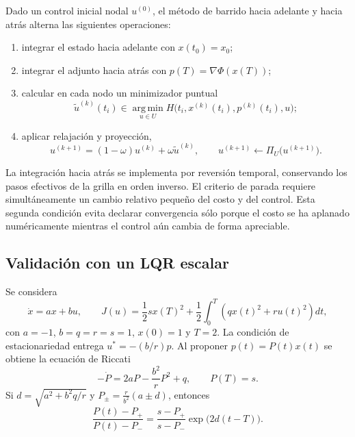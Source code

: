 \documentclass[11pt,a4paper]{article}
\begin{document}
Dado un control inicial nodal $u^{(0)}$, el método de barrido hacia adelante y hacia atrás alterna las siguientes operaciones:
\begin{enumerate}
    \item integrar el estado hacia adelante con $x(t_0)=x_0$;
    \item integrar el adjunto hacia atrás con $p(T)=\nabla\Phi(x(T))$;
    \item calcular en cada nodo un minimizador puntual
    \begin{equation}
        \widetilde u^{(k)}(t_i)
        \in \operatorname*{arg\,min}_{u\in U}
        H\bigl(t_i,x^{(k)}(t_i),p^{(k)}(t_i),u\bigr);
    \end{equation}
    \item aplicar relajación y proyección,
    \begin{equation}
        u^{(k+1)}=(1-\omega)u^{(k)}+\omega\widetilde u^{(k)},
        \qquad u^{(k+1)}\leftarrow\Pi_U\bigl(u^{(k+1)}\bigr).
    \end{equation}
\end{enumerate}

La integración hacia atrás se implementa por reversión temporal, conservando los pasos efectivos de la grilla en orden inverso. El criterio de parada requiere simultáneamente un cambio relativo pequeño del costo y del control. Esta segunda condición evita declarar convergencia sólo porque el costo se ha aplanado numéricamente mientras el control aún cambia de forma apreciable.

\subsection{Validación con un LQR escalar}

Se considera
\begin{equation}
    \dot x=ax+bu,
    \qquad
    J(u)=\frac{1}{2}s x(T)^2
    +\frac{1}{2}\int_0^T\left(qx(t)^2+ru(t)^2\right)dt,
\end{equation}
con $a=-1$, $b=q=r=s=1$, $x(0)=1$ y $T=2$. La condición de estacionariedad entrega $u^*=-(b/r)p$. Al proponer $p(t)=P(t)x(t)$ se obtiene la ecuación de Riccati
\begin{equation}
    -\dot P=2aP-\frac{b^2}{r}P^2+q,
    \qquad P(T)=s.
\end{equation}
Si $d=\sqrt{a^2+b^2q/r}$ y $P_{\pm}=\frac{r}{b^2}(a\pm d)$, entonces
\begin{equation}
    \frac{P(t)-P_+}{P(t)-P_-}
    =\frac{s-P_+}{s-P_-}\exp\bigl(2d(t-T)\bigr).
\end{equation}
\end{document}
